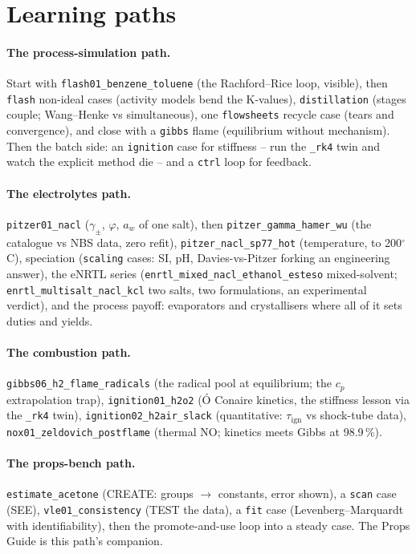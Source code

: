 \documentclass[11pt,a4paper]{article}
\begin{document}
\section*{Learning paths}

\paragraph{The process-simulation path.}
Start with \texttt{flash01\_benzene\_toluene} (the Rachford--Rice loop,
visible), then \texttt{flash} non-ideal cases (activity models bend the
K-values), \texttt{distillation} (stages couple; Wang--Henke vs
simultaneous), one \texttt{flowsheets} recycle case (tears and convergence),
and close with a \texttt{gibbs} flame (equilibrium without mechanism).
Then the batch side: an \texttt{ignition} case for stiffness -- run the
\texttt{\_rk4} twin and watch the explicit method die -- and a \texttt{ctrl}
loop for feedback.

\paragraph{The electrolytes path.}
\texttt{pitzer01\_nacl} ($\gamma_\pm$, $\varphi$, $a_w$ of one salt), then
\texttt{pitzer\_gamma\_hamer\_wu} (the catalogue vs NBS data, zero refit),
\texttt{pitzer\_nacl\_sp77\_hot} (temperature, to 200$^\circ$C),
speciation (\texttt{scaling} cases: SI, pH, Davies-vs-Pitzer forking an
engineering answer), the eNRTL series
(\texttt{enrtl\_mixed\_nacl\_ethanol\_esteso} mixed-solvent;
\texttt{enrtl\_multisalt\_nacl\_kcl} two salts, two formulations, an
experimental verdict), and the process payoff: evaporators and
crystallisers where all of it sets duties and yields.

\paragraph{The combustion path.}
\texttt{gibbs06\_h2\_flame\_radicals} (the radical pool at equilibrium; the
$c_p$ extrapolation trap), \texttt{ignition01\_h2o2} (\'O Conaire kinetics, the
stiffness lesson via the \texttt{\_rk4} twin), \texttt{ignition02\_h2air\_slack}
(quantitative: $\tau_{\mathrm{ign}}$ vs shock-tube data),
\texttt{nox01\_zeldovich\_postflame} (thermal NO; kinetics meets Gibbs at
98.9\,\%).

\paragraph{The props-bench path.}
\texttt{estimate\_acetone} (CREATE: groups $\to$ constants, error shown),
a \texttt{scan} case (SEE), \texttt{vle01\_consistency} (TEST the data),
a \texttt{fit} case (Levenberg--Marquardt with identifiability), then the
promote-and-use loop into a steady case.  The Props Guide is this path's
companion.
\end{document}
